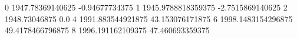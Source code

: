 0 1947.78369140625 -0.94677734375
1 1945.9788818359375 -2.7515869140625
2 1948.73046875 0.0
4 1991.883544921875 43.153076171875
6 1998.1483154296875 49.4178466796875
8 1996.191162109375 47.460693359375
